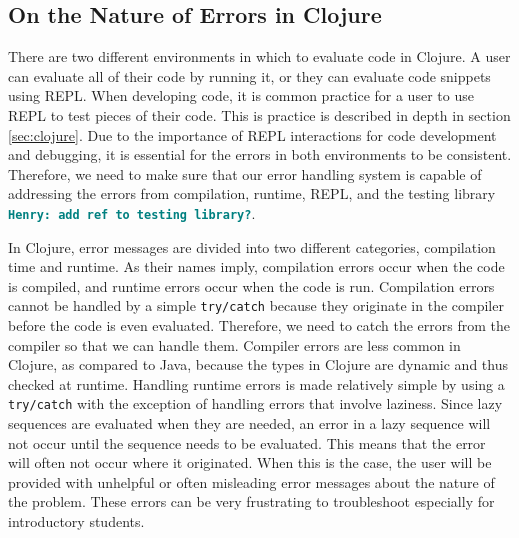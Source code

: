\documentclass[12pt]{article}
\newcommand{\comment}[1]{{\bf \tt  {#1}}}
\newcommand{\emcomment}[1]{\textcolor{ForestGreen}{\comment{Elena: {#1}}}}
\newcommand{\hfcomment}[1]{\textcolor{Teal}{\comment{Henry: {#1}}}}
\begin{document}
\subsection{On the Nature of Errors in Clojure}


There are two different environments in which to evaluate code in Clojure. A user can evaluate all of their code by running it, or they can evaluate code snippets using REPL. When developing code, it is common practice for a user to use REPL to test pieces of their code. This is practice is described in depth in section \ref{sec:clojure}. Due to the importance of REPL interactions for code development and debugging, it is essential for the errors in both environments to be consistent. Therefore, we need to make sure that our error handling system is capable of addressing the errors from compilation, runtime,  REPL, and the testing library \hfcomment{add ref to testing library?}.

In Clojure, error messages are divided into two different categories, compilation time and runtime. As their names imply, compilation errors occur when the code is compiled, and runtime errors occur when the code is run.
Compilation errors cannot be handled by a simple {\tt try/catch} because they originate in the compiler before the code is even evaluated. Therefore, we need to catch the errors from the compiler so that we can handle them. Compiler errors are less common in Clojure, as compared to Java, because the types in Clojure are dynamic and thus checked at runtime.
Handling runtime errors is made relatively simple by using a {\tt try/catch}  with the exception of handling errors that involve laziness. Since lazy sequences are evaluated when they are needed, an error in a lazy sequence will not occur until the sequence needs to be evaluated. This means that the error will often not occur where it originated. When this is the case, the user will be provided with unhelpful or often misleading error messages about the nature of the problem. These errors can be very frustrating to troubleshoot especially for introductory students. %
\end{document}
